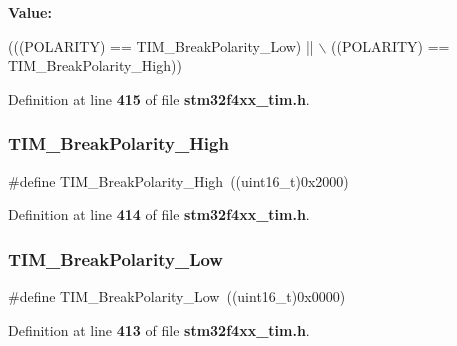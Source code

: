 {\bfseries Value\+:}
\begin{DoxyCode}
(((POLARITY) == TIM_BreakPolarity_Low) || \(\backslash\)
                                         ((POLARITY) == TIM_BreakPolarity_High))
\end{DoxyCode}


Definition at line \textbf{ 415} of file \textbf{ stm32f4xx\+\_\+tim.\+h}.

\mbox{\label{group__TIM__Break__Polarity_gabd4b72079548fd8903413a348539542b}} 
\subsubsection{T\+I\+M\+\_\+\+Break\+Polarity\+\_\+\+High}
{\footnotesize\ttfamily \#define T\+I\+M\+\_\+\+Break\+Polarity\+\_\+\+High~((uint16\+\_\+t)0x2000)}



Definition at line \textbf{ 414} of file \textbf{ stm32f4xx\+\_\+tim.\+h}.

\mbox{\label{group__TIM__Break__Polarity_ga565656ca81d17f9a1807afe3971dff6e}} 
\subsubsection{T\+I\+M\+\_\+\+Break\+Polarity\+\_\+\+Low}
{\footnotesize\ttfamily \#define T\+I\+M\+\_\+\+Break\+Polarity\+\_\+\+Low~((uint16\+\_\+t)0x0000)}



Definition at line \textbf{ 413} of file \textbf{ stm32f4xx\+\_\+tim.\+h}.

